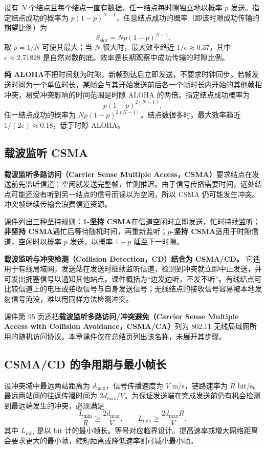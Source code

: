 设有 $N$ 个结点且每个结点一直有数据，任一结点每时隙独立地以概率 $p$ 发送。指定结点成功的概率为 $p(1-p)^{N-1}$，任意结点成功的概率（即该时隙成功传输的期望比例）为
\[
 S_{\mathrm{slot}}=Np(1-p)^{N-1}.
\]
取 $p=1/N$ 可使其最大；当 $N$ 很大时，最大效率趋近 $1/e\approx0.37$，其中 $e\approx2.71828$ 是自然对数的底。效率是长期观察中成功传输的时隙比例。

\textbf{纯 ALOHA}不把时间划为时隙，新帧到达后立即发送，不要求时钟同步。若帧发送时间为一个单位时长，某帧会与其开始发送前后各一个帧时长内开始的其他帧相冲突，易受冲突影响的时间范围是时隙 ALOHA 的两倍。指定结点成功概率为
\[
 p(1-p)^{2(N-1)},
\]
任一结点成功的概率为 $Np(1-p)^{2(N-1)}$。结点数很多时，最大效率趋近 $1/(2e)\approx0.18$，低于时隙 ALOHA。


\subsection{载波监听 CSMA}
\textbf{载波监听多路访问（Carrier Sense Multiple Access，CSMA）}要求结点在发送前先监听信道：空闲就发送完整帧，忙则推迟。由于信号传播需要时间，远处结点可能还没有听到另一结点的信号而误以为空闲，所以 CSMA 仍可能发生冲突。冲突帧继续传输会浪费信道资源。

课件列出三种坚持规则：\textbf{1-坚持 CSMA}在信道空闲时立即发送，忙时持续监听；\textbf{非坚持 CSMA}遇忙后等待随机时间，再重新监听；\textbf{$p$-坚持 CSMA}适用于时隙信道，空闲时以概率 $p$ 发送，以概率 $1-p$ 延至下一时隙。

\textbf{载波监听与冲突检测（Collision Detection，CD）结合为 CSMA/CD。} 它适用于有线局域网，发送站在发送时继续监听信道，检测到冲突就立即中止发送，并可发出拥塞信号以通知其他站点。课件概括为“边发边听，不发不听”。有线结点可比较信道上的电压或接收信号与自身发送信号；无线结点的接收信号容易被本地发射信号淹没，难以用同样方法检测冲突。

课件第 95 页还把\textbf{载波监听多路访问/冲突避免（Carrier Sense Multiple Access with Collision Avoidance，CSMA/CA）}列为 802.11 无线局域网所用的随机访问协议。本章课件仅在总结页列出该名称，未展开其步骤。


\subsection{CSMA/CD 的争用期与最小帧长}
设冲突域中最远两站距离为 $d_{\max}$，信号传播速度为 $V$ m/s，链路速率为 $R$ bit/s。最远两站间的往返传播时间为 $2d_{\max}/V$。为保证发送端在完成发送前仍有机会检测到最远端发生的冲突，必须满足
\[
 \frac{L_{\min}}{R}\ge \frac{2d_{\max}}{V},\qquad
 L_{\min}\ge \frac{2d_{\max}R}{V},
\]
其中 $L_{\min}$ 是以 bit 计的最小帧长。等号对应临界设计。提高速率或增大网络距离会要求更大的最小帧，缩短距离或降低速率则可减小最小帧。


